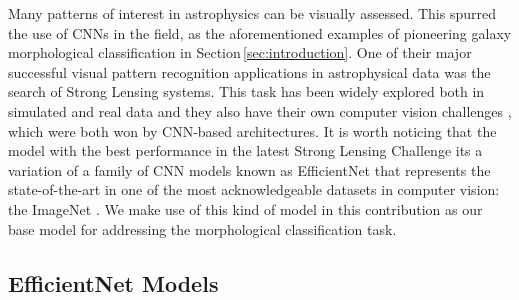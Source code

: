 \documentclass[fleqn,usenatbib]{mnras}
\begin{document}
Many patterns of interest in astrophysics can be visually assessed. This spurred the use of CNNs in the field, as the aforementioned examples of pioneering galaxy morphological classification in Section\,\ref{sec:introduction}. One of their major successful visual pattern recognition applications in astrophysical data was the search of Strong Lensing systems. This task has been widely explored both in simulated and real data \citep[see, e.g.][]{Bom2017, jacobs2017finding, lanusse2018cmu, 2019MNRAS.482..807P, 2019MNRAS.484.3879P, Cai2020} and they also have their own computer vision challenges \citep{challenge01,challenge02}, which were both won by CNN-based architectures. It is worth noticing that the model with the best performance in the latest Strong Lensing Challenge its a variation of a family of CNN models known as EfficientNet \citep{efficientnet} that represents the state-of-the-art in one of the most acknowledgeable datasets in computer vision: the ImageNet \citep{deng2009imagenet}. We make use of this kind of model in this contribution as our base model for addressing the morphological classification task.     




 



\subsection{EfficientNet Models}
\label{sec:models}
\end{document}
